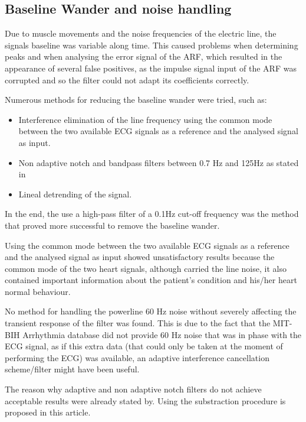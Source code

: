 \documentclass[conference]{IEEEtran}
\begin{document}
\subsection{Baseline Wander and noise handling}

Due to muscle movements and the noise frequencies of the electric line, the signals baseline was variable along time. This caused problems when determining peaks and when analysing the error signal of the ARF, which resulted in the appearance of several false positives, as the impulse signal input of the ARF was corrupted and so the filter could not adapt its coefficients correctly. \par
Numerous methods for reducing the baseline wander were tried, such as:
\begin{itemize}
\item Interference elimination of the line frequency using the common mode between the two available ECG signals as a reference and the analysed signal as input.
\item Non adaptive notch and bandpass filters between 0.7 Hz and 125Hz as stated in \cite{b2}
\item Lineal detrending of the signal.
\end{itemize}

In the end, the use a high-pass filter of a 0.1Hz cut-off frequency was the method that proved more successful to remove the baseline wander.\par
Using the common mode between the two available ECG signals as a reference and the analysed signal as input showed unsatisfactory results because the common mode of the two heart signals, although carried the line noise, it also contained important information about the patient's condition and his/her heart normal behaviour.\par
No method for handling the powerline 60 Hz noise without severely affecting the transient response of the filter was found. This is due to the fact that the MIT-BIH Arrhythmia database did not provide 60 Hz noise that was in phase with the ECG signal, as if this extra data (that could only be taken at the moment of performing the ECG) was available, an adaptive interference cancellation scheme/filter might have been useful. \par
The reason why adaptive and non adaptive notch filters do not achieve acceptable results were already stated by. Using the substraction procedure is proposed in this article. \par
\end{document}
